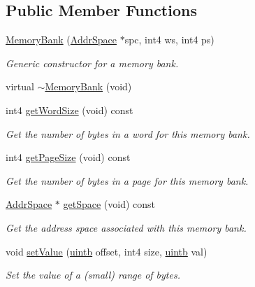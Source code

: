 \subsection*{Public Member Functions}
\begin{DoxyCompactItemize}
\item 
\mbox{\hyperlink{class_memory_bank_a87f6e0315637453fa0e1bd5110b9bdc9}{Memory\+Bank}} (\mbox{\hyperlink{class_addr_space}{Addr\+Space}} $\ast$spc, int4 ws, int4 ps)
\begin{DoxyCompactList}\small\item\em Generic constructor for a memory bank. \end{DoxyCompactList}\item 
virtual \mbox{\hyperlink{class_memory_bank_a4bb00e905a29ffba851774fdb96bacb0}{$\sim$\+Memory\+Bank}} (void)
\item 
int4 \mbox{\hyperlink{class_memory_bank_a996d7c04af8f8bf02ce7abb91d693dc5}{get\+Word\+Size}} (void) const
\begin{DoxyCompactList}\small\item\em Get the number of bytes in a word for this memory bank. \end{DoxyCompactList}\item 
int4 \mbox{\hyperlink{class_memory_bank_a020cac2b86f83b069c2f1914bc70cb2b}{get\+Page\+Size}} (void) const
\begin{DoxyCompactList}\small\item\em Get the number of bytes in a page for this memory bank. \end{DoxyCompactList}\item 
\mbox{\hyperlink{class_addr_space}{Addr\+Space}} $\ast$ \mbox{\hyperlink{class_memory_bank_a8e8f3ea79a07142e2d655eccf4ebc0f0}{get\+Space}} (void) const
\begin{DoxyCompactList}\small\item\em Get the address space associated with this memory bank. \end{DoxyCompactList}\item 
void \mbox{\hyperlink{class_memory_bank_a331f70cbc9d2c7172ebbaaa7e185c1e9}{set\+Value}} (\mbox{\hyperlink{types_8h_a2db313c5d32a12b01d26ac9b3bca178f}{uintb}} offset, int4 size, \mbox{\hyperlink{types_8h_a2db313c5d32a12b01d26ac9b3bca178f}{uintb}} val)
\begin{DoxyCompactList}\small\item\em Set the value of a (small) range of bytes. \end{DoxyCompactList}\item 

\end{DoxyCompactItemize}
